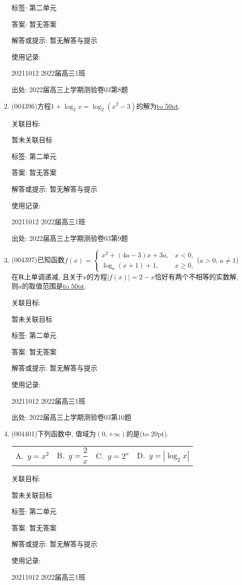 \documentclass[10pt,a4paper]{article}
\newcommand{\blank}[1]{\underline{\hbox to #1pt{}}}
\newcommand{\bracket}[1]{(\hbox to #1pt{})}
\newcommand{\fourch}[4]{\par\begin{tabular}{p{.23\textwidth}p{.23\textwidth}p{.23\textwidth}p{.23\textwidth}}
A.~#1 &B.~#2& C.~#3& D.~#4
\end{tabular}}
\begin{document}
\begin{enumerate}[1.]
标签: 第二单元

答案: 暂无答案

解答或提示: 暂无解答与提示

使用记录:

20211012	2022届高三1班	


出处: 2022届高三上学期测验卷03第8题
\item { (004396)}方程$1+\log_2x=\log_2(x^2-3)$的解为\blank{50}.


关联目标:

暂未关联目标



标签: 第二单元

答案: 暂无答案

解答或提示: 暂无解答与提示

使用记录:

20211012	2022届高三1班	


出处: 2022届高三上学期测验卷03第9题
\item { (004397)}已知函数$f(x)=\begin{cases}  x^2+(4a-3)x+3a,& x<0, \\ \log_a(x+1)+1,& x\ge 0, \end{cases}$($a>0$, $a\ne 1$)在$\mathbf{R}$上单调递减, 且关于$x$的方程$|f(x)|=2-x$恰好有两个不相等的实数解, 则$a$的取值范围是\blank{50}.


关联目标:

暂未关联目标



标签: 第二单元

答案: 暂无答案

解答或提示: 暂无解答与提示

使用记录:

20211012	2022届高三1班	


出处: 2022届高三上学期测验卷03第10题
\item { (004401)}下列函数中, 值域为$(0,+\infty)$的是\bracket{20}.
\fourch{$y=x^2$}{$y=\dfrac 2x$}{$y=2^x$}{$y=|\log_2x|$}


关联目标:

暂未关联目标



标签: 第二单元

答案: 暂无答案

解答或提示: 暂无解答与提示

使用记录:

20211012	2022届高三1班	



\end{enumerate}
\end{document}
